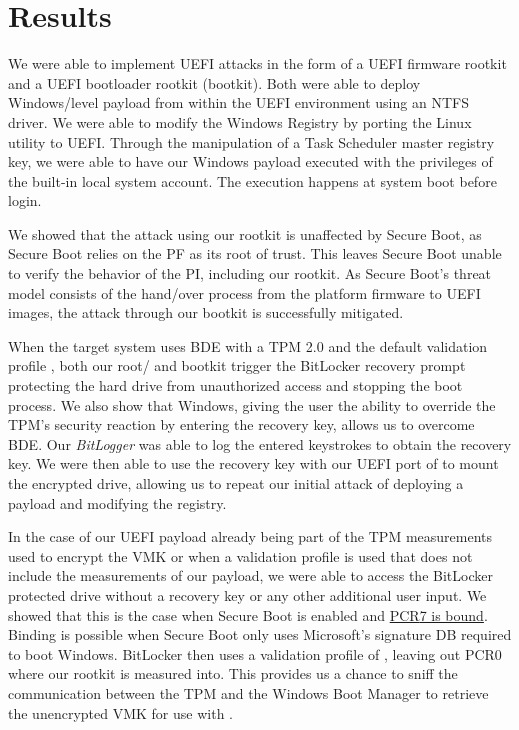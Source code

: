 
\chapter{Results}
\label{sec:results}

We were able to implement \ac{UEFI} attacks in the form of a \ac{UEFI} firmware rootkit and a \ac{UEFI} bootloader rootkit (bootkit).
Both were able to deploy Windows\-/level payload from within the \ac{UEFI} environment using an \ac{NTFS} driver.
We were able to modify the Windows Registry by porting the Linux utility  to \ac{UEFI}.
Through the manipulation of a Task Scheduler master registry key, we were able to have our Windows payload executed with the privileges of the built-in local system account.
The execution happens at system boot before login.

We showed that the attack using our rootkit is unaffected by Secure Boot, as Secure Boot relies on the \ac{PF} as its root of trust.
This leaves Secure Boot unable to verify the behavior of the \ac{PI}, including our rootkit.
As Secure Boot's threat model consists of the hand\-/over process from the platform firmware to \ac{UEFI} images, the attack through our bootkit is successfully mitigated.

When the target system uses \ac{BDE} with a \ac{TPM} 2.0 and the default validation profile \hyperref[tab:pcr-usage]{}, both our root\-/ and bootkit trigger the BitLocker recovery prompt protecting the hard drive from unauthorized access and stopping the boot process.
We also show that Windows, giving the user the ability to override the \ac{TPM}'s security reaction by entering the recovery key, allows us to overcome \ac{BDE}.
Our \emph{BitLogger} was able to log the entered keystrokes to obtain the recovery key.
We were then able to use the recovery key with our \ac{UEFI} port of  to mount the encrypted drive, allowing us to repeat our initial attack of deploying a payload and modifying the registry.

In the case of our \ac{UEFI} payload already being part of the \ac{TPM} measurements used to encrypt the \ac{VMK} or when a validation profile is used that does not include the measurements of our payload, we were able to access the BitLocker protected drive without a recovery key or any other additional user input.
We showed that this is the case when Secure Boot is enabled and \hyperlink{pcr7-binding}{\ac{PCR}7 is bound}.
Binding is possible when Secure Boot only uses Microsoft's signature \ac{DB} required to boot Windows.
BitLocker then uses a validation profile of \hyperref[tab:pcr-usage]{}, leaving out \ac{PCR}0 where our rootkit is measured into.
This provides us a chance to sniff the communication between the \ac{TPM} and the Windows Boot Manager to retrieve the unencrypted \ac{VMK} for use with .